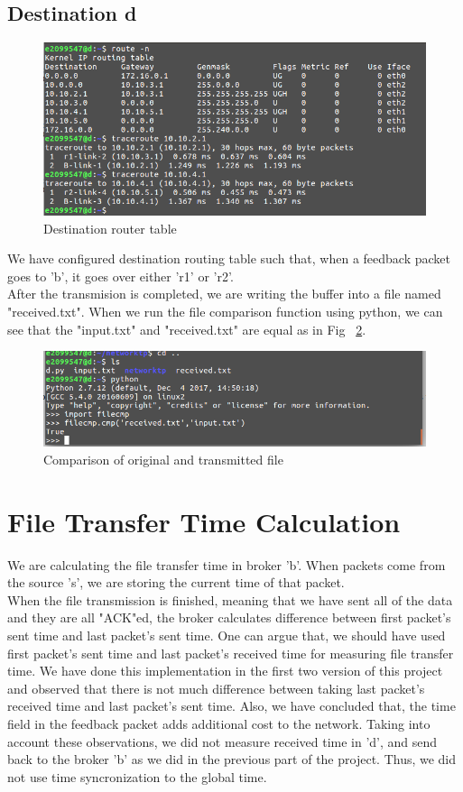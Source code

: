 \documentclass[12pt,journal,compsoc]{IEEEtran}
\begin{document}
\subsection{Destination d}
\begin{figure}[h!]
\centering
\captionsetup{justification=centering}
\includegraphics[width = \linewidth]{routed.png}
\caption{Destination router table}
\label{fig:routed}
\end{figure}
We have configured destination routing table such that, when a feedback packet goes to 'b', it goes over either 'r1' or 'r2'.\\
After the transmision is completed, we are writing the buffer into a file named "received.txt". When we run the file comparison function using python, we can see that the "input.txt" and "received.txt" are equal as in Fig ~\ref{fig:comparison}.
\begin{figure}[h!]
\centering
\captionsetup{justification=centering}
\includegraphics[width = \linewidth]{comparison.png}
\caption{Comparison of original and transmitted file}
\label{fig:comparison}
\end{figure}
\section{File Transfer Time Calculation}
We are calculating the file transfer time in broker 'b'. When packets come from the source 's', we are storing the current time of that packet.\\
When the file transmission is finished, meaning that we have sent all of the data and they are all "ACK"ed, the broker calculates difference between first packet's sent time and last packet's sent time. One can argue that, we should have used first packet's sent time and last packet's received time for measuring file transfer time. We have done this implementation in the first two version of this project and observed that there is not much difference between taking last packet's received time and last packet's sent time. Also, we have concluded that, the time field in the feedback packet adds additional cost to the network. Taking into account these observations, we did not measure received time in 'd', and send back to the broker 'b' as we did in the previous part of the project. Thus, we did not use time syncronization to the global time.\\
\end{document}
